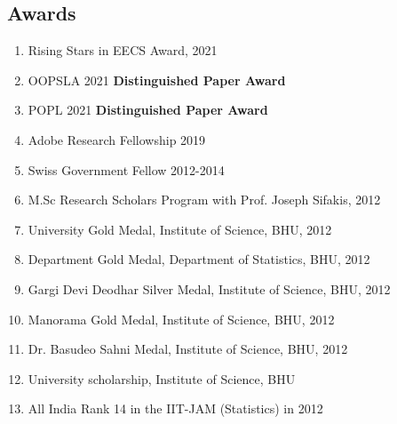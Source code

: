 \documentclass[margin, 10pt]{res} %
\begin{document}
\begin{resume}
\section{Awards}
\begin{enumerate}[itemsep=.5pt]
\item Rising Stars in EECS Award, 2021
\item OOPSLA 2021 \textbf{Distinguished Paper Award}
\item POPL 2021 \textbf{Distinguished Paper Award}
\item Adobe Research Fellowship 2019
\item Swiss Government Fellow 2012-2014
\item M.Sc Research Scholars Program with Prof. Joseph Sifakis, 2012
\item University Gold Medal, Institute of Science, BHU, 2012
\item Department Gold Medal, Department of Statistics, BHU, 2012
\item Gargi Devi Deodhar Silver Medal, Institute of Science, BHU, 2012
\item Manorama Gold Medal, Institute of Science, BHU, 2012
\item Dr. Basudeo Sahni Medal, Institute of Science, BHU, 2012
\item University scholarship, Institute of Science, BHU
\item All India Rank 14 in the IIT-JAM (Statistics) in 2012
\end{enumerate}


\end{resume}
\end{document}
